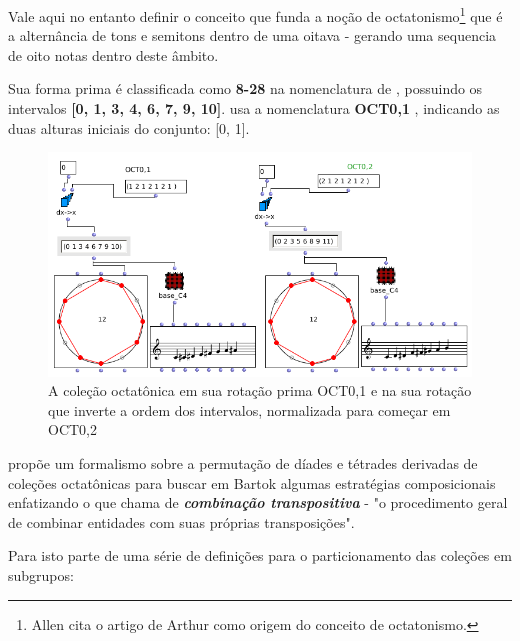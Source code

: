 \documentclass[
	12pt,				%
	openright,			%
	twoside,			%
	a4paper,			%
	english,			%
	french,				%
	spanish,			%
	brazil				%
	]{abntex2}
\begin{document}
Vale aqui no entanto definir o conceito que funda a noção de octatonismo\footnote{Allen  cita o artigo de Arthur  como origem do conceito de octatonismo.} que é a alternância de tons e semitons dentro de uma oitava - gerando uma sequencia de oito notas dentro deste âmbito. 

Sua forma prima é classificada como\textbf{ 8-28} na nomenclatura de , possuindo os intervalos \textbf{[0, 1, 3, 4, 6, 7, 9, 10]}.  usa a nomenclatura  \textbf{OCT0,1 }, indicando as duas alturas iniciais do conjunto: [0, 1].

\begin{figure}[!h]
	\caption{\label{fig_grafico} A coleção octatônica em sua rotação prima OCT0,1 e na sua rotação que inverte a ordem dos intervalos, normalizada para começar em OCT0,2}
	\begin{center}
	    \includegraphics[scale=0.5]{octa/octaOM.png}
	\end{center}
\end{figure}

 propõe um formalismo sobre a permutação de díades e tétrades derivadas de coleções octatônicas para buscar em Bartok algumas estratégias composicionais enfatizando o que chama de \textbf{\textit{combinação transpositiva}} - "o procedimento geral de combinar entidades com suas próprias transposições".\cite[ p.x]{cohn1991bartok}

Para isto parte de uma série de definições para o particionamento das coleções em subgrupos:
\end{document}

